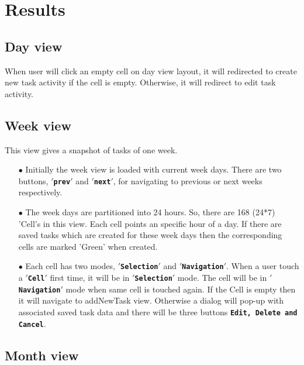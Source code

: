 \documentclass[10pt,a4paper]{report}
\begin{document}
\section{Results}
\label{sresults}





\subsection{Day view}
When user will click an empty cell on day view layout, it will redirected to create new task activity if the cell is empty. Otherwise, it will redirect to edit task activity.




\subsection{Week view}

This view gives a snapshot of tasks of one week.

\begin{itemize}

 \item[$\bullet$] Initially the week view is loaded with current week days. There are two buttons, \textbf{\texttt{$'$prev$'$}} and \textbf{\texttt{$'$next$'$}}, for navigating to previous or next weeks respectively.
 \item[$\bullet$] The week days are partitioned into 24 hours. So, there are 168 (24*7) 'Cell's in this view. Each cell points an specific hour of a day. If there are saved tasks which are created for these week days then the corresponding cells are marked 'Green' when created.
 \item[$\bullet$] Each cell has two modes, \textbf{\texttt{$'$Selection$'$}} and \textbf{\texttt{$'$Navigation$'$}}. When a user touch a \textbf{\texttt{$'$Cell$'$}} first time, it will be in \textbf{\texttt{$'$Selection$'$}} mode. The cell will be in \textbf{\texttt{$'$Navigation$'$}} mode when same cell is touched again. If the Cell is empty then it will navigate to addNewTask view. Otherwise a dialog will pop-up with associated saved task data and there will be three buttons \textbf{\texttt{Edit, Delete and Cancel}}.
  
\end{itemize}
 

\subsection{Month view}
\end{document}

